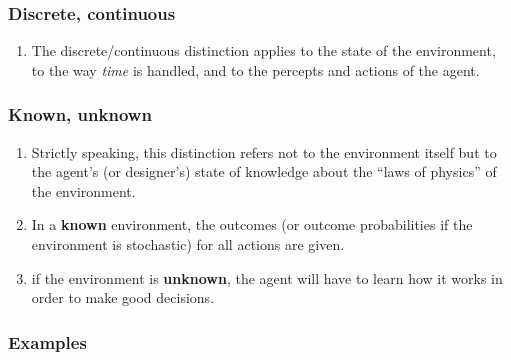 \subsubsection{Discrete, continuous}
\begin{enumerate}
    \item The discrete/continuous distinction applies to the state of the environment, to the way \textit{time} is handled, and to the percepts and actions of the agent.
    \hfill \cite{ai/book/Artificial-Intelligence-A-Modern-Approach/Russell-Norvig}


\end{enumerate}



\subsubsection{Known, unknown}
\begin{enumerate}
    \item Strictly speaking, this distinction refers not to the environment itself but to the agent’s (or designer’s) state of knowledge about the “laws of physics” of the environment.
    \hfill \cite{ai/book/Artificial-Intelligence-A-Modern-Approach/Russell-Norvig}

    \item In a \textbf{known} environment, the outcomes (or outcome probabilities if the environment is stochastic) for all actions are given.
    \hfill \cite{ai/book/Artificial-Intelligence-A-Modern-Approach/Russell-Norvig}

    \item  if the environment is \textbf{unknown}, the agent will have to learn how it works in order to make good decisions.
    \hfill \cite{ai/book/Artificial-Intelligence-A-Modern-Approach/Russell-Norvig}


\end{enumerate}



\subsubsection*{Examples \cite{ai/book/Artificial-Intelligence-A-Modern-Approach/Russell-Norvig}}

